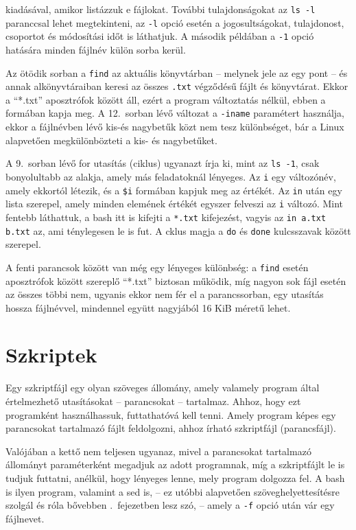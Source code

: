 \noindent kiadásával, amikor listázzuk e fájlokat. További tulajdonságokat az
\texttt{ls -l} paranccsal lehet megtekinteni, az \texttt{-l} opció esetén a
jogosultságokat, tulajdonost, csoportot és módosítási időt is láthatjuk. A
második példában a \texttt{-1} opció hatására minden fájlnév külön sorba kerül.

Az ötödik sorban a \texttt{find} az aktuális könyvtárban -- melynek jele az egy
pont -- és annak alkönyvtáraiban keresi az összes \texttt{.txt} végződésű fájlt
és könyvtárat. Ekkor a ``*.txt'' aposztrófok között áll, ezért a program
változtatás nélkül, ebben a formában kapja meg. A 12.\ sorban lévő változat a
\texttt{-iname} paramétert használja, ekkor a fájlnévben lévő kis-és nagybetűk
közt nem tesz különbséget, bár a Linux alapvetően megkülönbözteti a kis- és
nagybetűket.

A 9.\ sorban lévő for utasítás (ciklus) ugyanazt írja ki, mint az \texttt{ls
  -1}, csak bonyolultabb az alakja, amely más feladatoknál lényeges. Az
\texttt{i} egy változónév, amely ekkortól létezik, és a \texttt{\$i} formában
kapjuk meg az értékét. Az \texttt{in} után egy lista szerepel, amely minden
elemének értékét egyszer felveszi az \texttt{i} változó. Mint fentebb láthattuk,
a bash itt is kifejti a \texttt{*.txt} kifejezést, vagyis az \texttt{in a.txt
  b.txt} az, ami ténylegesen le is fut. A cklus magja a \texttt{do} és
\texttt{done} kulcsszavak között szerepel.

A fenti parancsok között van még egy lényeges különbség: a \texttt{find} esetén
aposztrófok között szereplő ``*.txt'' biztosan működik, míg nagyon sok fájl
esetén az összes többi nem, ugyanis ekkor nem fér el a parancssorban, egy
utasítás hossza fájlnévvel, mindennel együtt nagyjából 16 KiB méretű lehet.

\section{Szkriptek}
\label{sec:scripts}

Egy szkriptfájl egy olyan szöveges állomány, amely valamely program által
értelmezhető utasításokat -- parancsokat -- tartalmaz. Ahhoz, hogy ezt
programként használhassuk, futtathatóvá kell tenni. Amely program képes egy
parancsokat tartalmazó fájlt feldolgozni, ahhoz írható szkriptfájl
(parancsfájl). 

Valójában a kettő nem teljesen ugyanaz, mivel a parancsokat tartalmazó állományt
paraméterként megadjuk az adott programnak, míg a szkriptfájlt le is tudjuk
futtatni, anélkül, hogy lényeges lenne, mely program dolgozza fel. A bash is
ilyen program, valamint a sed is, -- ez utóbbi alapvetően szöveghelyettesítésre
szolgál és róla bővebben .\ fejezetben lesz szó, -- amely a
\texttt{-f} opció után vár egy fájlnevet. 

